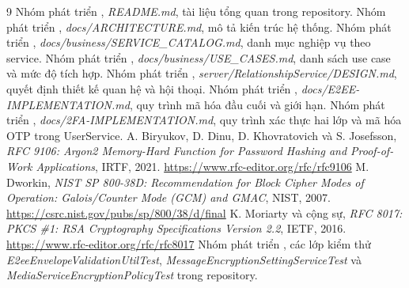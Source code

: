 \begin{thebibliography}{9}
 Nhóm phát triển \project{}, \emph{README.md}, tài liệu tổng quan trong repository.
 Nhóm phát triển \project{}, \emph{docs/ARCHITECTURE.md}, mô tả kiến trúc hệ thống.
 Nhóm phát triển \project{}, \emph{docs/business/SERVICE\_CATALOG.md}, danh mục nghiệp vụ theo service.
 Nhóm phát triển \project{}, \emph{docs/business/USE\_CASES.md}, danh sách use case và mức độ tích hợp.
 Nhóm phát triển \project{}, \emph{server/RelationshipService/DESIGN.md}, quyết định thiết kế quan hệ và hội thoại.
 Nhóm phát triển \project{}, \emph{docs/E2EE-IMPLEMENTATION.md}, quy trình mã hóa đầu cuối và giới hạn.
 Nhóm phát triển \project{}, \emph{docs/2FA-IMPLEMENTATION.md}, quy trình xác thực hai lớp và mã hóa OTP trong UserService.
 A. Biryukov, D. Dinu, D. Khovratovich và S. Josefsson, \emph{RFC 9106: Argon2 Memory-Hard Function for Password Hashing and Proof-of-Work Applications}, IRTF, 2021. \url{https://www.rfc-editor.org/rfc/rfc9106}
 M. Dworkin, \emph{NIST SP 800-38D: Recommendation for Block Cipher Modes of Operation: Galois/Counter Mode (GCM) and GMAC}, NIST, 2007. \url{https://csrc.nist.gov/pubs/sp/800/38/d/final}
 K. Moriarty và cộng sự, \emph{RFC 8017: PKCS \#1: RSA Cryptography Specifications Version 2.2}, IETF, 2016. \url{https://www.rfc-editor.org/rfc/rfc8017}
 Nhóm phát triển \project{}, các lớp kiểm thử \emph{E2eeEnvelopeValidationUtilTest}, \emph{MessageEncryptionSettingServiceTest} và \emph{MediaServiceEncryptionPolicyTest} trong repository.
\end{thebibliography}

